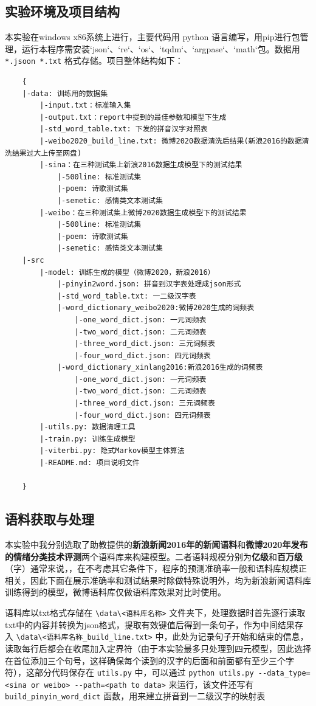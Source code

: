 \documentclass{article}
\begin{document}
\begin{spacing}{1.1}
	\subsection{实验环境及项目结构}
	本实验在windows x86系统上进行，主要代码用 python 语言编写，用pip进行包管理，运行本程序需安装`json`、`re`、`os`、`tqdm`、`argpase`、`math`包。数据用 \verb|*.jsoon *.txt| 格式存储。项目整体结构如下：
	\begin{lstlisting}
	{
	|-data: 训练用的数据集
		|-input.txt：标准输入集
		|-output.txt：report中提到的最佳参数和模型下生成
		|-std_word_table.txt: 下发的拼音汉字对照表
		|-weibo2020_build_line.txt: 微博2020数据清洗后结果(新浪2016的数据清洗结果过大上传至网盘)
		|-sina：在三种测试集上新浪2016数据生成模型下的测试结果
			|-500line: 标准测试集
			|-poem: 诗歌测试集
			|-semetic: 感情类文本测试集
		|-weibo：在三种测试集上微博2020数据生成模型下的测试结果
			|-500line: 标准测试集
			|-poem: 诗歌测试集
			|-semetic: 感情类文本测试集
	|-src
		|-model: 训练生成的模型（微博2020，新浪2016）
			|-pinyin2word.json: 拼音到汉字表处理成json形式
			|-std_word_table.txt: 一二级汉字表
			|-word_dictionary_weibo2020:微博2020生成的词频表
				|-one_word_dict.json: 一元词频表
				|-two_word_dict.json: 二元词频表
				|-three_word_dict.json: 三元词频表
				|-four_word_dict.json: 四元词频表
			|-word_dictionary_xinlang2016:新浪2016生成的词频表
				|-one_word_dict.json: 一元词频表
				|-two_word_dict.json: 二元词频表
				|-three_word_dict.json: 三元词频表
				|-four_word_dict.json: 四元词频表
		|-utils.py: 数据清理工具
		|-train.py: 训练生成模型
		|-viterbi.py: 隐式Markov模型主体算法
		|-README.md: 项目说明文件
		
	}
	\end{lstlisting}
	\subsection{语料获取与处理}
	\hspace{1.4em}
	本实验中我分别选取了助教提供的\textbf{新浪新闻2016年的新闻语料}和\textbf{微博2020年发布的情绪分类技术评测}两个语料库来构建模型。二者语料规模分别为\textbf{亿级}和\textbf{百万级}（字）通常来说，，在不考虑其它条件下，程序的预测准确率一般和语料库规模正相关，因此下面在展示准确率和测试结果时除做特殊说明外，均为新浪新闻语料库训练得到的模型，微博语料库仅做语料库效果对比时使用。
	
	语料库以txt格式存储在 \verb|\data\<语料库名称>| 文件夹下，处理数据时首先逐行读取txt中的内容并转换为json格式，提取有效键值后得到一条句子，作为中间结果存入 \verb|\data\<语料库名称_build_line.txt>| 中，此处为记录句子开始和结束的信息，读取每行后都会在收尾加入定界符（由于本实验最多只处理到四元模型，因此选择在首位添加三个句号，这样确保每个读到的汉字的后面和前面都有至少三个字符），这部分代码保存在 \verb|utils.py| 中，可以通过 \verb|python utils.py --data_type=<sina or weibo> --path=<path to data>| 来运行，该文件还写有 \verb|build_pinyin_word_dict| 函数，用来建立拼音到一二级汉字的映射表
	

\end{spacing}
\end{document}
